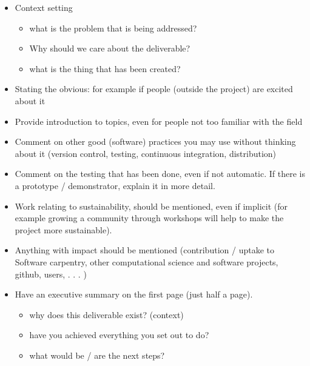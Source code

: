 \documentclass{deliverablereport}
\begin{document}
\begin{itemize}
\item Context setting
  \begin{itemize}
  \item what is the problem that is being addressed?
  \item Why should we care about the deliverable?
  \item what is the thing that has been created?
  \end{itemize}

\item Stating the obvious: for example if people (outside the project)
  are excited about it

\item Provide introduction to topics, even for people not too familiar
  with the field
\item Comment on other good (software) practices you may use without
  thinking about it (version control, testing, continuous integration,
  distribution)

\item Comment on the testing that has been done, even if not
  automatic. If there is a prototype / demonstrator, explain it in
  more detail.
\item Work relating to sustainability, should be mentioned, even if
  implicit (for example growing a community through workshops will
  help to make the project more sustainable).

\item Anything with impact should be mentioned (contribution / uptake
  to Software carpentry, other computational science and software
  projects, github, users, . . . )

\item Have an executive summary on the
  first page (just half a page).
  \begin{itemize}
  \item why does this deliverable exist? (context)
  \item have you achieved everything you set out to do?
  \item what would be / are the next steps?
  \end{itemize}

\end{itemize}


\end{document}
